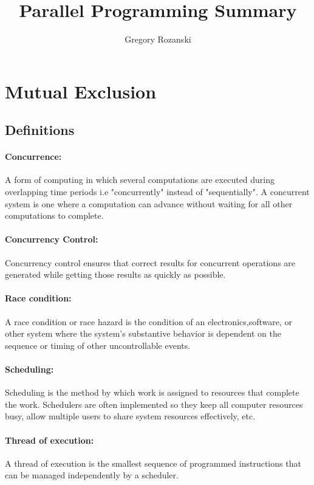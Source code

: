 \documentclass[8pt]{extreport}
\title{Parallel Programming Summary}
\author{Gregory Rozanski}
\begin{document}
	\maketitle
	\newpage
\section{Mutual Exclusion}
\subsection{Definitions}
\paragraph{Concurrence:\\}
A form of computing in which several computations are executed during overlapping time periods i.e "concurrently" instead of "sequentially". A concurrent system is one where a computation can advance without waiting for all other computations to complete.
\paragraph{Concurrency Control:\\}
 Concurrency control ensures that correct results for concurrent operations are generated while getting those results as quickly as possible.
\paragraph{Race condition:\\}
A race condition or race hazard is the condition of an electronics,software, or other system where the system's substantive behavior is dependent on the sequence or timing of other uncontrollable events.
\paragraph{Scheduling:\\}
Scheduling is the method by which work is assigned to resources that complete the work. Schedulers are often implemented so they keep all computer resources busy, allow multiple users to share system resources effectively, etc.
\paragraph{Thread of execution:\\}
A thread of execution is the smallest sequence of programmed instructions that can be managed independently by a scheduler.
\end{document}
